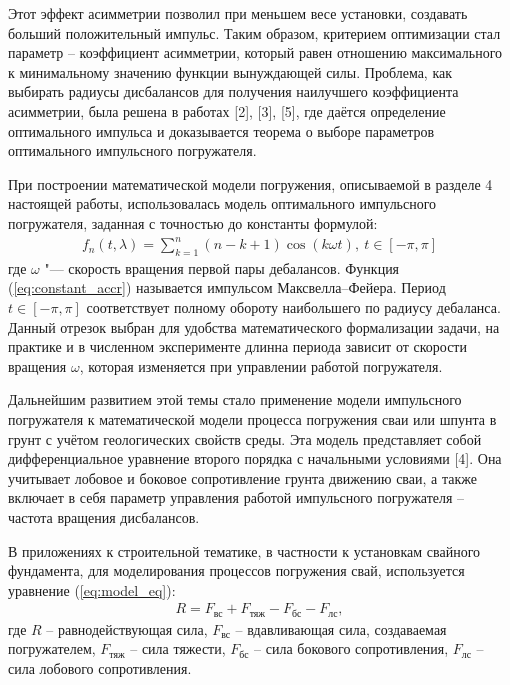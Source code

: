 Этот эффект асимметрии позволил при меньшем весе установки, создавать больший положительный импульс. Таким образом, критерием
оптимизации стал параметр – коэффициент асимметрии, который равен отношению максимального к минимальному значению функции
вынуждающей силы. Проблема, как выбирать радиусы дисбалансов для получения наилучшего коэффициента асимметрии, была решена в работах [2],
[3], [5], где даётся определение оптимального импульса и доказывается теорема о выборе параметров оптимального импульсного погружателя.

При построении математической модели погружения, описываемой в разделе 4 настоящей работы, использовалась модель оптимального
импульсного погружателя, заданная с точностью до константы формулой:
\begin{equation}\label{eq:constant_accr}
    \begin{gathered}
        f_n(t,\lambda) = \sum\limits_{k = 1}^n (n-k+1) \cos(k \omega t), \ t \in [-\pi, \pi]
    \end{gathered}
\end{equation}
\noindent где $\omega$ "--- скорость вращения первой пары дебалансов. Функция (\ref{eq:constant_accr}) называется импульсом Максвелла–Фейера.
Период $t \in [-\pi, \pi]$ соответствует полному обороту наибольшего по радиусу дебаланса. Данный отрезок выбран для
удобства математического формализации задачи, на практике и в численном эксперименте длинна периода зависит от скорости вращения $\omega$,
которая изменяется при управлении работой погружателя.

Дальнейшим развитием этой темы стало применение модели импульсного погружателя к математической модели процесса погружения
сваи или шпунта в грунт с учётом геологических свойств среды. Эта модель представляет собой дифференциальное уравнение второго порядка с
начальными условиями [4]. Она учитывает лобовое и боковое сопротивление грунта движению сваи, а также включает в себя параметр управления работой
импульсного погружателя – частота вращения дисбалансов.

В приложениях к строительной тематике, в частности к установкам свайного фундамента, для моделирования процессов погружения свай, используется уравнение (\ref{eq:model_eq}):
\begin{equation}\label{eq:model_eq}
    \begin{gathered}
        R = F_{\textrm{вс}} + F_{\textrm{тяж}} - F_{\textrm{бс}} - F_{\textrm{лс}},
    \end{gathered}
\end{equation}
\noindent где $R$ – равнодействующая сила, $F_{\textrm{вс}}$ – вдавливающая сила, создаваемая погружателем, $F_{\textrm{тяж}}$ – сила тяжести, $F_{\textrm{бс}}$ – сила бокового сопротивления, $F_{\textrm{лс}}$ – сила лобового сопротивления.

